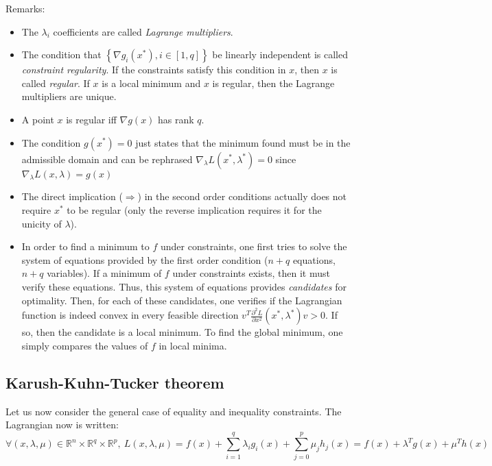 \documentclass{article}
\begin{document}
\noindent Remarks:
\begin{itemize}
\item The $\lambda_i$ coefficients are called \emph{Lagrange multipliers}.
\item The condition that $\left\{ \nabla g_i(x^*), i\in
[1,q] \right\}$ be linearly independent is called \emph{constraint regularity}. If the constraints satisfy this condition in $x$, then $x$ is called \emph{regular}. If $x$ is a local minimum and $x$ is regular, then the Lagrange multipliers are unique.
\item A point $x$ is regular iff $\nabla g(x)$ has rank $q$.
\item The condition $g(x^*)=0$ just states that the minimum found must be in the admissible domain and can be rephrased $\nabla_\lambda L(x^*,\lambda^*)=0$ since $\nabla_\lambda L(x,\lambda)=g(x)$
\item The direct implication ($\Rightarrow$) in the second order conditions actually does not require $x^*$ to be regular (only the reverse implication requires it for the unicity of $\lambda$).
\item In order to find a minimum to $f$ under constraints, one first tries to solve the system of equations provided by the first order condition ($n+q$ equations, $n+q$ variables). If a minimum of $f$ under constraints exists, then it must verify these equations. Thus, this system of equations provides \emph{candidates} for optimality. Then, for each of these candidates, one verifies if the Lagrangian function is indeed convex in every feasible direction $v^T \frac{\partial^2 L}{\partial x^2}(x^*,\lambda^*) v > 0$. If so, then the candidate is a local minimum. To find the global minimum, one simply compares the values of $f$ in local minima.
\end{itemize}

\subsection{Karush-Kuhn-Tucker theorem}

Let us now consider the general case of equality and inequality constraints. The Lagrangian now is written:
\begin{equation*}
\forall (x,\lambda,\mu)\in \mathbb{R}^n \times \mathbb{R}^q\times\mathbb{R}^p, \ 
L(x,\lambda,\mu) = f(x) +
\sum\limits_{i=1}^q \lambda_i g_i(x) + \sum\limits_{j=0}^p \mu_jh_j(x) = f(x) +
\lambda^T g(x) + \mu^T h(x)
\end{equation*}
\end{document}
